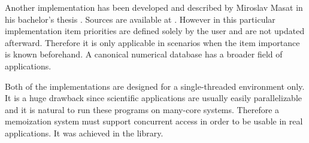 Another implementation has been developed and described by Miroslav Masat in his bachelor’s thesis \cite{masat}. Sources are available at \cite{ccherish}. However in this particular implementation item priorities are defined solely by the user and are not updated afterward. Therefore it is only applicable in scenarios when the item importance is known beforehand. A canonical numerical database has a broader field of applications.

Both of the implementations are designed for a single-threaded environment only. It is a huge drawback since scientific applications are usually easily parallelizable and it is natural to run these programs on many-core systems. Therefore a memoization system must support concurrent access in order to be usable in real applications. It was achieved in the \numdbname library.

